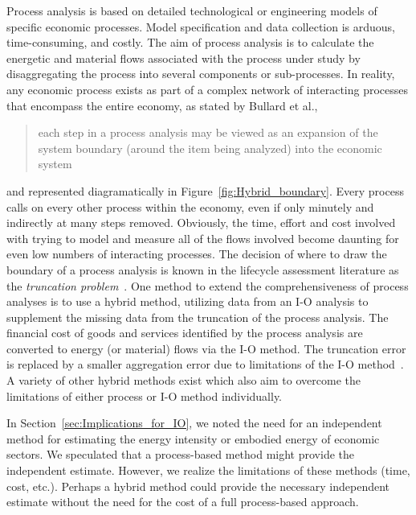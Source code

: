 Process analysis is based on detailed technological
or engineering models of specific economic processes.
Model specification and data collection is arduous,
time-consuming,
and costly.
The aim of process analysis is to calculate the
energetic and material flows associated with the process
under study by disaggregating the process into
several components or sub-processes.
In reality,
any economic process exists as part of a complex network of
interacting processes that encompass the entire economy, as
stated by Bullard et al., 
\begin{quote}
	each step in a process analysis may be viewed as 
	an expansion of the system boundary 
	(around the item being analyzed) 
	into the economic system~\cite[p.281]{Bullard:1978vd}
\end{quote}
and represented diagramatically in Figure~\ref{fig:Hybrid_boundary}.
Every process calls on every other process within the economy,
even if only minutely and indirectly at many steps removed.
Obviously,
the time, 
effort and cost involved with trying to model and
measure all of the flows involved become daunting
for even low numbers of interacting processes.
The decision of where to draw the boundary of
a process analysis is known in the 
lifecycle assessment literature as the 
\emph{truncation problem}~\cite{Suh2004}.
One method to extend the comprehensiveness of process
analyses is to use a hybrid method,
utilizing data from an I-O analysis to supplement the
missing data from the truncation of the process analysis.
The financial cost of goods and services identified by
the process analysis are converted to energy
(or material) flows via the I-O method.
The truncation error is replaced by a smaller aggregation
error due to limitations of the I-O 
method~\cite{Bullard:1978vd}.
A variety of other hybrid methods exist which also aim to
overcome the limitations of either process or I-O method 
individually.\cite{Bullard:1978vd, Suh2004, Suh2002, 
Crawford2008, Zhai2010}

In Section~\ref{sec:Implications_for_IO},
we noted the need for an independent method
for estimating the energy intensity or embodied 
energy of economic sectors.
We speculated that a process-based method
might provide the independent estimate. 
However, we realize the limitations of these
methods (time, cost, etc.).
Perhaps a hybrid method could provide the necessary 
independent estimate without the need for the 
cost of a full process-based approach.


